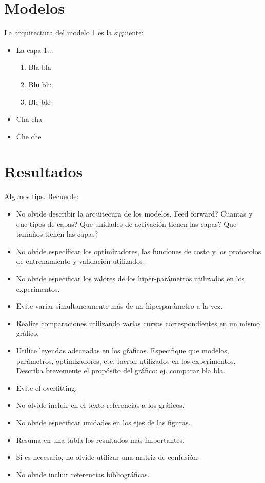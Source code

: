 \documentclass[aps,prl,preprint,groupedaddress]{revtex4-2}
\begin{document}
\section{Modelos}

La arquitectura del modelo 1 es la siguiente:
\begin{itemize}
    \item La capa 1...
    \begin{enumerate}
        \item Bla bla
        \item Blu blu
        \item Ble ble
    \end{enumerate}
    \item Cha cha
    \item Che che
\end{itemize}

\section{Resultados}

{\color{red}
Algunos tips. Recuerde:
\begin{itemize}
\item No olvide describir la arquitecura de los modelos. Feed forward? Cuantas y que tipos de capas? Que unidades de activación tienen las capas? Que tamaños tienen las capas?
\item No olvide especificar los optimizadores, las funciones de costo y los protocolos de entrenamiento y validación utilizados.
\item No olvide especificar los valores de los hiper-parámetros utilizados en los experimentos.
\item Evite variar simultaneamente más de un hiperparámetro a la vez.
\item Realize comparaciones utilizando varias curvas correspondientes en un mismo gráfico.
\item Utilice leyendas adecuadas en los gŕaficos. Especifique que modelos, parámetros, optimizadores, etc. fueron utilizados en los experimentos. Describa brevemente el propósito del gráfico: ej. comparar bla bla.
\item Evite el overfitting.
\item No olvide incluir en el texto referencias a los gráficos.
\item No olvide especificar unidades en los ejes de las figuras.
\item Resuma en una tabla los resultados más importantes.
\item Si es necesario, no olvide utilizar una matriz de confusión.
\item No olvide incluir referencias bibliográficas.
\end{itemize}
}
\end{document}
